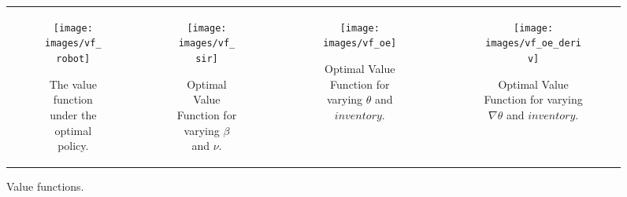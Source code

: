 %

{\centering
    \begin{figure*}[ht]
        \begin{tabular}{cccc}
            \begin{subfigure}{0.24\textwidth}\centering\texttt{[image: images/vf\_robot]}\caption{The value function under the optimal policy.}\label{fig:navigation_vf}\end{subfigure}&
            \begin{subfigure}{0.24\textwidth}\centering\texttt{[image: images/vf\_sir]}\caption{Optimal Value Function for varying {\footnotesize $ \beta $} and {\footnotesize $ \nu $}.}\label{fig:sir_vf}\end{subfigure}&
            \begin{subfigure}{0.24\textwidth}\centering\texttt{[image: images/vf\_oe]}\caption{Optimal Value Function for varying {\footnotesize $ \theta $} and {\footnotesize $ inventory $}.}\label{fig:oe_vf}\end{subfigure}&
            \begin{subfigure}{0.24\textwidth}\centering\texttt{[image: images/vf\_oe\_deriv]}\caption{Optimal Value Function for varying {\footnotesize $\nabla \theta $} and {\footnotesize $ inventory $}.}\label{fig:oe_vf_deriv}\end{subfigure}\\            
        \end{tabular}
        \caption{Value functions.}
        \label{tab:vf_Results}
    \end{figure*}
}

